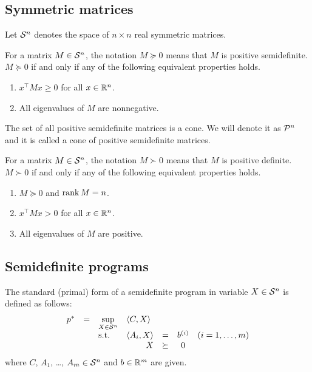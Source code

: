 \subsection{Symmetric matrices}
Let $\mathcal{S}^n$ denotes the space of $n\times n$ real symmetric matrices.

For a matrix $M\in\mathcal{S}^n$, the notation $M \succeq 0$ means that $M$ is positive semidefinite.
$M \succeq 0$ if and only if any of the following equivalent properties holds.
\begin{enumerate}
  \item $x^\top Mx \geq 0$ for all $x \in \mathbb{R}^n$.
  \item All eigenvalues of $M$ are nonnegative.
\end{enumerate}
The set of all positive semidefinite matrices is a cone.
We will denote it as $\mathcal{P}^n$ and it is called a cone of positive semidefinite matrices.

For a matrix $M\in\mathcal{S}^n$, the notation $M \succ 0$ means that $M$ is positive definite.
$M \succ 0$ if and only if any of the following equivalent properties holds.
\begin{enumerate}
  \item $M \succeq 0$ and $\operatorname{rank} M = n$.
  \item $x^\top Mx > 0$ for all $x \in \mathbb{R}^n$.
  \item All eigenvalues of $M$ are positive.
\end{enumerate}

\subsection{Semidefinite programs}
The standard (primal) form of a semidefinite program in variable $X\in\mathcal{S}^n$ is defined as follows:
\begin{eqnarray}
  \begin{array}{rclrrclcll}
    p^* &=& \displaystyle \sup_{X\in\Sym^n} & \multicolumn{3}{l}{\langle C,X\rangle} \\
    && \text{s.t.} & \langle A_i, X\rangle &=& b\ind i & (i = 1,\ldots,m)\\
    &&& X &\succeq& 0
  \end{array}
\end{eqnarray}
where $C$, $A_1$, \ldots, $A_m \in \mathcal{S}^n$ and $b\in\mathbb{R}^m$ are given.

